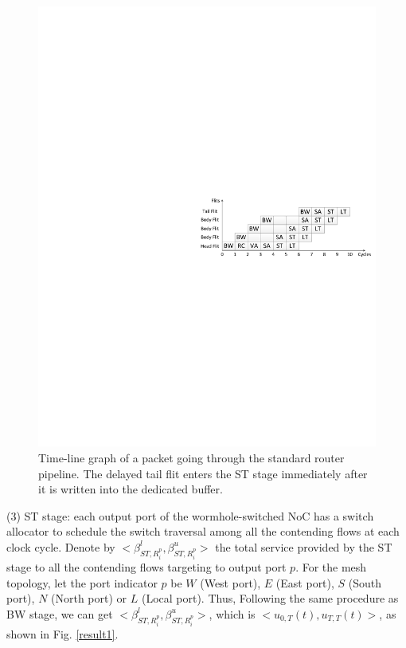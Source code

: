 \documentclass[preprint]{elsarticle}
\begin{document}
\begin{figure}
  \centering
  \includegraphics[scale=0.35]{fig6.pdf}
  \caption{Time-line graph of a packet going through the standard router pipeline. The delayed tail flit enters the ST stage immediately after it is written into the dedicated buffer.}\label{pipeline}
\end{figure}

(3) ST stage: each output port of the wormhole-switched NoC has a switch allocator to schedule the switch traversal among all the contending flows at each clock cycle. Denote by $<\beta_{ST,R_i^{p}}^l,\beta_{ST,R_i^{p}}^u>$ the total service provided by the ST stage to all the contending flows targeting to output port $p$. For the mesh topology, let the port indicator $p$ be $W$ (West port), $E$ (East port), $S$ (South port), $N$ (North port) or $L$ (Local port). Thus, Following the same procedure as BW stage, we can get $<\beta_{ST,R_i^{p}}^l,\beta_{ST,R_i^{p}}^u>$, which is $<u_{0,T}(t),u_{T,T}(t)>$, as shown in Fig. \ref{result1}.
\end{document}
